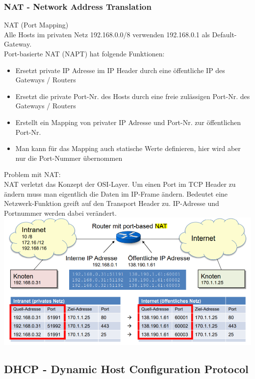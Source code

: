 \columnbreak

\subsubsection{NAT - Network Address Translation}

\begin{definition}{NAT (Port Mapping)}\\
    Alle Hosts im privaten Netz 192.168.0.0/8 verwenden 192.168.0.1 als Default-Gateway.\\
    Port-basierte NAT (NAPT) hat folgende Funktionen:
    \begin{itemize}
        \item Ersetzt private IP Adresse im IP Header durch eine öffentliche IP des Gateways / Routers
        \item Ersetzt die private Port-Nr. des Hosts durch eine freie zulässigen Port-Nr. des Gateways / Routers
        \item Erstellt ein Mapping von privater IP Adresse und Port-Nr. zur öffentlichen Port-Nr.
        \item Man kann für das Mapping auch statische Werte definieren, hier wird aber nur die Port-Nummer übernommen
    \end{itemize}
    Problem mit NAT:\\
    NAT verletzt das Konzept der OSI-Layer. Um einen Port im TCP Header zu ändern muss man eigentlich die
    Daten im IP-Frame ändern. Bedeutet eine Netzwerk-Funktion greift auf den Transport Header zu.
    IP-Adresse und Portnummer werden dabei verändert. \\
        \includegraphics[width=1\linewidth]{images/NAT.png}
\end{definition}

\columnbreak

\subsection{DHCP - Dynamic Host Configuration Protocol}

